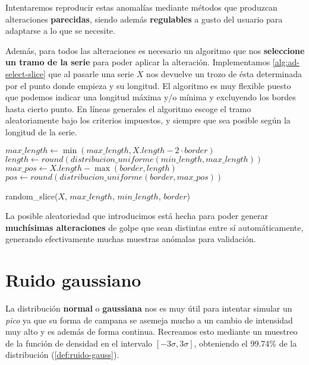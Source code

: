 Intentaremos reproducir estas anomalías mediante métodos que produzcan alteraciones \textbf{parecidas}, siendo además \textbf{regulables} a gusto del usuario para adaptarse a lo que se necesite.

Además, para todos las alteraciones es necesario un algoritmo que nos \textbf{seleccione un tramo de la serie} para poder aplicar la alteración. Implementamos \autoref{alg:ad-select-slice} que al pasarle una serie $X$ nos devuelve un trozo de ésta determinada por el punto donde empieza y su longitud. El algoritmo es muy flexible puesto que podemos indicar una longitud máxima y/o mínima y excluyendo los bordes hasta cierto punto. En líneas generales el algoritmo escoge el tramo aleatoriamente bajo los criterios impuestos, y siempre que sea posible según la longitud de la serie.

\begin{algorithm}[htbp]
\SetAlgoLined
  $max\_length \gets \min(max\_length, X.length - 2 \cdot border)$\;
  $length \gets round(distribucion\_uniforme(min\_length, max\_length))$\;
  $max\_pos \gets X.length - \max(border, length)$\;
  $pos \gets round(distribucion\_uniforme(border, max\_pos))$\;
 \caption{random\_slice($X$, $max\_length$, $min\_length$, $border$)}
 \label{alg:ad-select-slice}
\end{algorithm}

La posible aleatoriedad que introducimos está hecha para poder generar \textbf{muchísimas alteraciones} de golpe que sean distintas entre sí automáticamente, generando efectivamente muchas muestras anómalas para validación.

\section{Ruido gaussiano}

La distribución \textbf{normal} o \textbf{gaussiana} nos es muy útil para intentar simular un \emph{pico} ya que su forma de campana se asemeja mucho a un cambio de intensidad muy alto y es además de forma continua. Recreamos esto mediante un muestreo de la función de densidad en el intervalo $[-3 \sigma, 3 \sigma]$, obteniendo el 99.74\% de la distribución (\autoref{def:ruido-gauss}).

